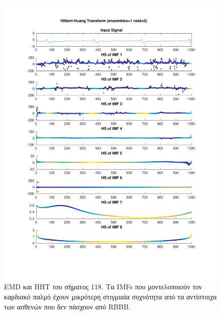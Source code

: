 \documentclass[11pt,a4paper]{article}
\begin{document}
\begin{figure}[H]
\begin{minipage}{0.48\textwidth}
	\includegraphics[width=\textwidth]{fig/118l1_hht.pdf}
\end{minipage}
\vfill
\caption{EMD και HHT του σήματος 118. Τα IMFs που μοντελοποιούν τον καρδιακό παλμό έχουν μικρότερη στιγμιαία συχνότητα από τα αντίστοιχα των ασθενών που δεν πάσχουν από RBBB.}
\label{fig:118l1_hht}
\end{figure}
\end{document}
